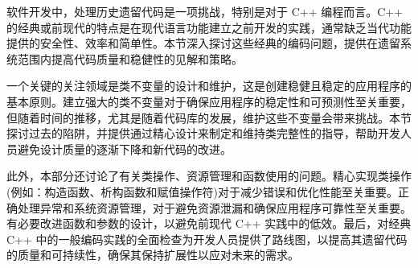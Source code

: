 软件开发中，处理历史遗留代码是一项挑战，特别是对于 C++ 编程而言。C++ 的经典或前现代的特点是在现代语言功能建立之前开发的实践，通常缺乏当代功能提供的安全性、效率和简单性。本节深入探讨这些经典的编码问题，提供在遗留系统范围内提高代码质量和稳健性的见解和策略。

一个关键的关注领域是类不变量的设计和维护，这是创建稳健且稳定的应用程序的基本原则。建立强大的类不变量对于确保应用程序的稳定性和可预测性至关重要，但随着时间的推移，尤其是随着代码库的发展，维护这些不变量会带来挑战。本节探讨过去的陷阱，并提供通过精心设计来制定和维持类完整性的指导，帮助开发人员避免设计质量的逐渐下降和新代码的改进。

此外，本部分还讨论了有关类操作、资源管理和函数使用的问题。精心实现类操作(例如：构造函数、析构函数和赋值操作符)对于减少错误和优化性能至关重要。正确处理异常和系统资源管理，对于避免资源泄漏和确保应用程序可靠性至关重要。有必要改进函数和参数的设计，以避免前现代 C++ 实践中的低效。最后，对经典 C++ 中的一般编码实践的全面检查为开发人员提供了路线图，以提高其遗留代码的质量和可持续性，确保其保持扩展性以应对未来的需求。
